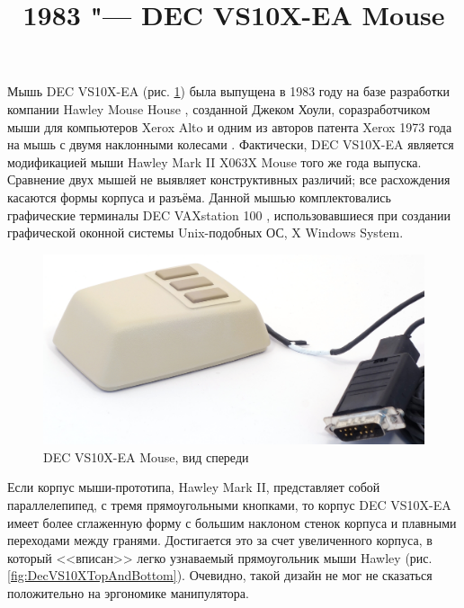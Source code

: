 \documentclass[11pt, a4paper]{article}
\begin{document}
\title{1983 "--- DEC VS10X-EA Mouse}
\date{}
\maketitle
{}
Мышь DEC VS10X-EA (рис. \ref{fig:DecVS10XPic}) была выпущена в 1983 году на базе разработки компании Hawley Mouse House \cite{hawley,mouses}, созданной Джеком Хоули, соразработчиком мыши для компьютеров Xerox Alto и одним из авторов патента Xerox 1973 года на мышь с двумя наклонными колесами \cite{pat}. Фактически, DEC VS10X-EA является модификацией мыши Hawley Mark II X063X Mouse того же года выпуска. Сравнение двух мышей не выявляет конструктивных различий; все расхождения касаются формы корпуса и разъёма. Данной мышью комплектовались графические терминалы DEC VAXstation 100 \cite{reddit}, использовавшиеся при создании графической оконной системы Unix-подобных ОС, X Windows System.

\begin{figure}[h]
   \centering
    \includegraphics[scale=0.6]{1983_dec_vs10x_ea_mouse/pic_30.jpg}
    \caption{DEC VS10X-EA Mouse, вид спереди}
    \label{fig:DecVS10XPic}
\end{figure}

Если корпус мыши-прототипа, Hawley Mark II, представляет собой параллелепипед, с тремя прямоугольными кнопками, то корпус DEC VS10X-EA имеет более сглаженную форму с большим наклоном стенок корпуса и плавными переходами между гранями. Достигается это за счет увеличенного корпуса, в который <<вписан>> легко узнаваемый прямоугольник мыши Hawley (рис. \ref{fig:DecVS10XTopAndBottom}). Очевидно, такой дизайн не мог не сказаться положительно на эргономике манипулятора.
\end{document}
